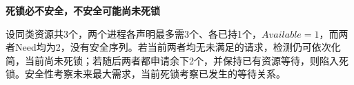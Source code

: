 {\color{ink}\bfseries 死锁必不安全，不安全可能尚未死锁}\par\vspace{1bp}设同类资源共3个，两个进程各声明最多需3个、各已持1个，\(Available=\allowbreak{}1\)，而两者Need均为2，没有安全序列。若当前两者均无未满足的请求，检测仍可依次化简，当前尚未死锁；若随后两者都申请余下2个，并保持已有资源等待，则陷入死锁。安全性考察未来最大需求，当前死锁考察已发生的等待关系。
